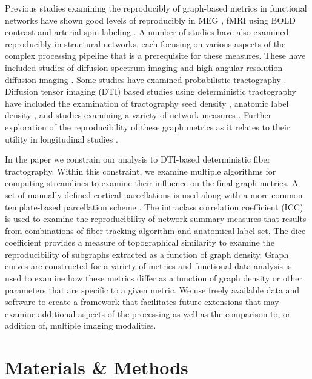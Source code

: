 \documentclass{frontiersSCNS} %
\begin{document}
Previous studies examining the reproducibly of graph-based metrics in
functional networks have shown good levels of reproducibly in MEG
\citep{Deuker2009}, fMRI using BOLD contrast
\citep{Telesford2010,Braun2012,Schwarz2011,Liang2012,Weber2013} and
arterial spin labeling \citep{Weber2013}. A number of studies have also examined
reproducibly in structural networks, each focusing on various aspects
of the complex processing pipeline that is a prerequisite for these
measures. These have included studies of diffusion spectrum imaging
\citep{Cammoun2012,Bassett2011N} and high angular resolution diffusion
imaging \citep{Dennis2012}. Some studies have examined probabilistic
tractography \citep{Owen2013BC,Vaessen2010}. Diffusion tensor imaging (DTI) based studies using
deterministic tractography have included the examination of
tractography seed density \citep{Cheng2012N}, anatomic label density
\citep{Bassett2011N}, and studies examining a variety of network
measures \citep{Cheng2012N,Irimia2012N}. Further exploration of the reproducibility of
these graph metrics as it relates to their utility in longitudinal studies \citep{Telesford2013}.

In the paper we constrain our analysis to DTI-based deterministic fiber
tractography. Within this constraint, we examine multiple algorithms
for computing streamlines to examine their influence on the final graph metrics. A set of manually defined
cortical parcellations \citep{Klein2012} is used along with a more common template-based
parcellation scheme \citep{Tzourio-Mazoyer2002}. The intraclass correlation coefficient (ICC) is used to 
examine the reproducibility of network summary measures that results from combinations
of fiber tracking algorithm and anatomical label set. The dice coefficient provides a measure
of topographical similarity to examine the reproducibility of subgraphs extracted as a
function of graph density. Graph curves are constructed for a variety of metrics and functional data analysis is used
to examine how these metrics differ as a function of graph density or other parameters
that are specific to a given metric. We use freely
available data and software to create a framework that facilitates future extensions
that may examine additional aspects of the processing as well as the
comparison to, or addition of, multiple imaging modalities. 

\section{Materials \& Methods}
\end{document}
